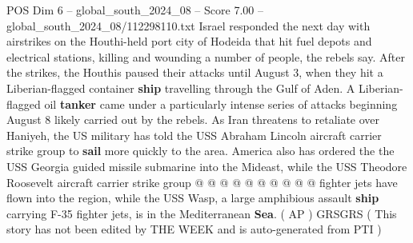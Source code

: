 \begin{textsample}{POS Dim 6 – global\_south\_2024\_08 – Score 7.00 – global\_south\_2024\_08/112298110.txt}
Israel responded the next day with airstrikes on the Houthi-held port city of Hodeida that hit fuel depots and electrical stations, killing and wounding a number of people, the rebels say.
After the strikes, the Houthis paused their attacks until August 3, when they hit a Liberian-flagged container \textbf{ship} travelling through the Gulf of Aden.
A Liberian-flagged oil \textbf{tanker} came under a particularly intense series of attacks beginning August 8 likely carried out by the rebels.
As Iran threatens to retaliate over Haniyeh, the US military has told the USS Abraham Lincoln aircraft carrier strike group to \textbf{sail} more quickly to the area.
America also has ordered the the USS Georgia guided missile submarine into the Mideast, while the USS Theodore Roosevelt aircraft carrier strike group @ @ @ @ @ @ @ @ @ @ fighter jets have flown into the region, while the USS Wasp, a large amphibious assault \textbf{ship} carrying F-35 fighter jets, is in the Mediterranean \textbf{Sea}. ( AP ) GRSGRS ( This story has not been edited by THE WEEK and is auto-generated from PTI )

\end{textsample}
